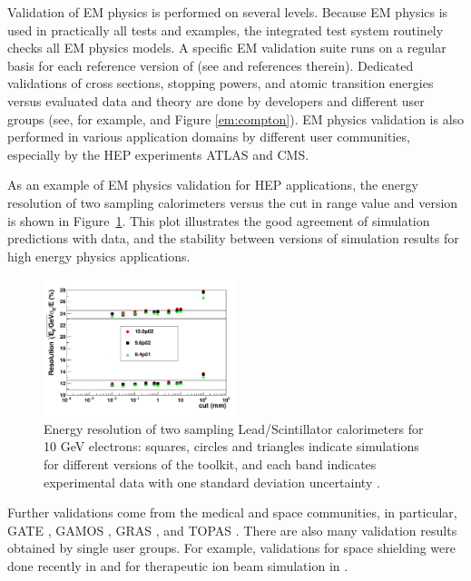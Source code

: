 Validation of EM physics is performed on several levels.  Because EM physics is
used in practically all tests and examples, the \Gfour{} integrated test system 
routinely checks all EM physics models.  A specific EM validation suite
\cite{embib:emVal} runs on a regular basis for each reference version of \Gfour{}
(see \cite{embib:chep14,embib:chep11,embib:chep12} and references therein).
Dedicated validations of cross sections, stopping powers, and atomic transition
energies versus evaluated data and theory are done by \Gfour{} developers and 
different user groups (see, for example, 
\cite{embib:uni2,embib:valGam,embib:valGam2} and 
Figure \ref{em:compton}).  EM physics validation is also performed in various
application domains by different user communities, especially by the HEP 
experiments ATLAS and CMS. 

As an example of EM physics validation for HEP applications, the energy 
resolution of two sampling calorimeters \cite{embib:uni3,embib:uni4} 
versus the cut in range value and \Gfour{} version is shown in 
Figure~\ref{Figure-UEM1}.  This plot illustrates the good agreement of \Gfour{}
simulation predictions with data, and the stability between \Gfour{} versions of 
simulation results for high energy physics applications.

\begin{figure}
\includegraphics[width=0.5\textwidth]{figures/Azeus.pdf}
\caption{Energy resolution of two sampling Lead/Scintillator calorimeters 
for 10 GeV electrons: squares, circles and triangles indicate \Gfour{} 
simulations for different versions of the toolkit, and each band indicates 
experimental data with one standard deviation uncertainty
\cite{embib:uni3,embib:uni4}.}
\label{Figure-UEM1}
\end{figure}

Further validations come from the medical and space communities, in particular, 
GATE \cite{embib:GATE}, GAMOS \cite{embib:GAMOS}, GRAS \cite{embib:gras}, 
and TOPAS \cite{embib:TOPAS}.
There are also many validation results obtained by single user groups.  For 
example, validations for space shielding were done recently in 
\cite{embib:elshield} and for therapeutic ion beam simulation in 
\cite{embib:emIonUser}.


